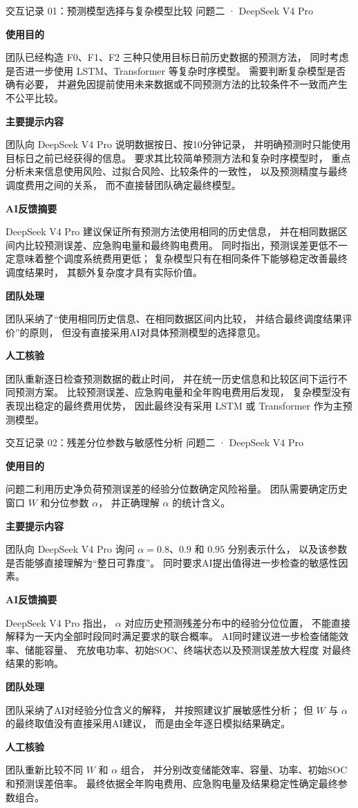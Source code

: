 \documentclass[UTF8,a4paper,11pt]{ctexart}
\newcommand{\recorditem}[1]{%
    \par\vspace{0.28em}
    \noindent\textbf{#1}\quad
}
\begin{document}
\begin{recordbox}
{交互记录 01：预测模型选择与复杂模型比较}
{问题二 · DeepSeek V4 Pro}

\recorditem{使用目的}
团队已经构造 F0、F1、F2 三种只使用目标日前历史数据的预测方法，
同时考虑是否进一步使用 LSTM、Transformer 等复杂时序模型。
需要判断复杂模型是否确有必要，
并避免因提前使用未来数据或不同预测方法的比较条件不一致而产生不公平比较。

\recorditem{主要提示内容}
团队向 DeepSeek V4 Pro 说明数据按日、按10分钟记录，
并明确预测时只能使用目标日之前已经获得的信息。
要求其比较简单预测方法和复杂时序模型时，
重点分析未来信息使用风险、过拟合风险、比较条件的一致性，
以及预测精度与最终调度费用之间的关系，
而不直接替团队确定最终模型。

\recorditem{AI反馈摘要}
DeepSeek V4 Pro 建议保证所有预测方法使用相同的历史信息，
并在相同数据区间内比较预测误差、应急购电量和最终购电费用。
同时指出，预测误差更低不一定意味着整个调度系统费用更低；
复杂模型只有在相同条件下能够稳定改善最终调度结果时，
其额外复杂度才具有实际价值。

\recorditem{团队处理}
团队采纳了“使用相同历史信息、在相同数据区间内比较，
并结合最终调度结果评价”的原则，
但没有直接采用AI对具体预测模型的选择意见。

\recorditem{人工核验}
团队重新逐日检查预测数据的截止时间，
并在统一历史信息和比较区间下运行不同预测方案。
比较预测误差、应急购电量和全年购电费用后发现，
复杂模型没有表现出稳定的最终费用优势，
因此最终没有采用 LSTM 或 Transformer 作为主预测模型。
\end{recordbox}

\begin{recordbox}
{交互记录 02：残差分位参数与敏感性分析}
{问题二 · DeepSeek V4 Pro}

\recorditem{使用目的}
问题二利用历史净负荷预测误差的经验分位数确定风险裕量。
团队需要确定历史窗口 $W$ 和分位参数 $\alpha$，
并正确理解 $\alpha$ 的统计含义。

\recorditem{主要提示内容}
团队向 DeepSeek V4 Pro 询问
$\alpha=0.8$、$0.9$ 和 $0.95$
分别表示什么，
以及该参数是否能够直接理解为“整日可靠度”。
同时要求AI提出值得进一步检查的敏感性因素。

\recorditem{AI反馈摘要}
DeepSeek V4 Pro 指出，
$\alpha$ 对应历史预测残差分布中的经验分位位置，
不能直接解释为一天内全部时段同时满足要求的联合概率。
AI同时建议进一步检查储能效率、储能容量、
充放电功率、初始SOC、终端状态以及预测误差放大程度
对最终结果的影响。

\recorditem{团队处理}
团队采纳了AI对经验分位含义的解释，
并按照建议扩展敏感性分析；
但 $W$ 与 $\alpha$ 的最终取值没有直接采用AI建议，
而是由全年逐日模拟结果确定。

\recorditem{人工核验}
团队重新比较不同 $W$ 和 $\alpha$ 组合，
并分别改变储能效率、容量、功率、初始SOC和预测误差倍率。
最终依据全年购电费用、应急购电量及结果稳定性确定最终参数组合。
\end{recordbox}
\end{document}
